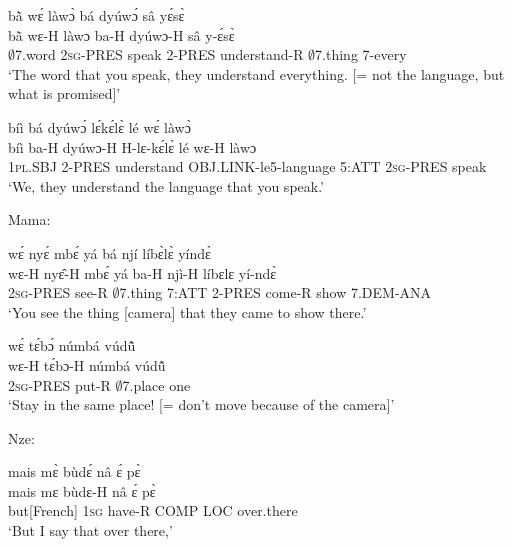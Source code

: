\begin{exe} 
\exC\label{211} 
  \glll bã̀ wɛ́ làwɔ̀ bá dyúwɔ́ sâ yɛ́sɛ̀\\
         bã̀ wɛ-H làwɔ ba-H dyúwɔ-H sâ y-ɛ́sɛ̀ \\
         $\emptyset$7.word 2\textsc{sg}-PRES speak 2-PRES understand-R $\emptyset$7.thing 7-every\\
    \trans `The word that you speak, they understand everything. [= not the language, but what is promised]'
\end{exe}

\begin{exe} 
\exC\label{212} 
  \glll bíì bá dyúwɔ́ lɛ́kɛ́lɛ̀ lé wɛ́ làwɔ̀\\
        bíì ba-H dyúwɔ-H H-lɛ-kɛ́lɛ̀ lé wɛ-H làwɔ\\
         1\textsc{pl}.SBJ 2-PRES understand OBJ.LINK-le5-language 5:ATT 2\textsc{sg}-PRES speak\\
    \trans `We, they understand the language that you speak.'
\end{exe}

\noindent Mama:

\begin{exe} 
\exC\label{213} 
  \glll wɛ́ nyɛ́ mbɛ́ yá bá njí líbɛ̀lɛ̀ yíndɛ̀ \\
        wɛ-H nyɛ̂-H mbɛ́ yá ba-H njì-H líbɛlɛ yí-ndɛ̀ \\
        2\textsc{sg}-PRES see-R $\emptyset$7.thing 7:ATT 2-PRES come-R show 7.DEM-ANA  \\
    \trans `You see the thing [camera] that they came to show there.'
\end{exe}

\begin{exe} 
\exC\label{214}
  \glll wɛ́ tɛ́bɔ́ númbá vúdũ̂ \\
       wɛ-H tɛ́bɔ-H númbá vúdũ̂ \\
        2\textsc{sg}-PRES put-R $\emptyset$7.place one  \\
    \trans `Stay in the same place! [= don't move because of the camera]'
\end{exe}

\noindent Nze:

\begin{exe} 
\exC\label{215} 
  \glll  mais mɛ̀ bùdɛ́ nâ ɛ́ pɛ̀  \\
       mais mɛ bùdɛ-H nâ ɛ́ pɛ̀ \\
         but[French] 1\textsc{sg} have-R COMP LOC over.there \\
    \trans `But I say that over there,'
\end{exe}

